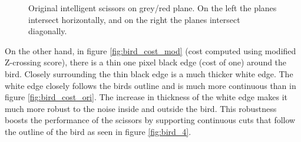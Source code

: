\documentclass[11pt]{article}
\begin{document}
\begin{figure}[H]
%
\hfill
{}%
\caption{\label{fig:gradient} Original intelligent scissors on grey/red plane. On the left the planes intersect horizontally, and on the right the planes intersect diagonally.}
\end{figure}


On the other hand, in figure \ref{fig:bird_cost_mod} (cost computed using modified Z-crossing score), there is a thin one pixel black edge (cost of one) around the bird. Closely surrounding the thin black edge is a much thicker white edge. The white edge closely follows the birds outline and is much more continuous than in figure \ref{fig:bird_cost_ori}. The increase in thickness of the white edge makes it much more robust to the noise inside and outside the bird. This robustness boosts the performance of the scissors by supporting continuous cuts that follow the outline of the bird as seen in figure \ref{fig:bird_4}.\\
\end{document}
